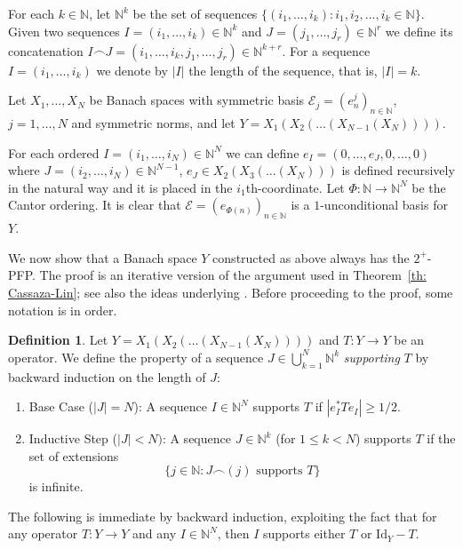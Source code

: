 \documentclass[11pt]{amsart}
\theoremstyle{plain}
\theoremstyle{definition}
\newtheorem{definition}[theorem]{Definition}
\numberwithin{equation}{section}
\newcommand{\N}{\mathbb{N}}
\newcommand{\Id}{\mathrm{Id}}
\renewcommand{\le}{\leqslant}
\renewcommand{\geq}{\geqslant}
\begin{document}
For each $k \in \N$, let $\N^k$ be the set of sequences $\{(i_1, \dots, i_k): i_1, i_2, \ldots, i_k \in \N\}$. Given two sequences $I = (i_1, \dots, i_k) \in \N^k$ and $J = (j_1, \dots, j_r) \in \N^r$ we define its concatenation $I \smallfrown J = (i_1, \dots, i_k, j_1, \dots, j_r) \in \N^{k+r}$. For a sequence $I = (i_1, \dots, i_k)$ we denote by $|I|$ the length of the sequence, that is, $|I| = k$.

Let $X_1, \dots, X_N$ be Banach spaces with symmetric basis $\mathcal{E}_j = (e^j_n)_{n \in \N}$, $j = 1, \dots, N$ and symmetric norms, and let $Y = X_1(X_{2}(\dots (X_{N-1}(X_N))))$.

For each ordered $I = (i_1, \dots, i_N) \in \N^N$ we can define $e_I = (0, \dots, e_{J}, 0, \dots, 0)$ where $J = (i_2, \dots, i_N) \in \N^{N-1}$, $e_J \in X_2(X_3(\dots(X_N)))$ is defined recursively in the natural way and it is placed in the $i_1$th-coordinate. Let $\Phi: \N \to \N^N$ be the Cantor ordering. It is clear that $\mathcal{E} = (e_{\Phi(n)})_{n \in \N}$ is a $1$-unconditional basis for $Y$.

We now show that a Banach space $Y$ constructed as above always has the $2^+$-PFP. The proof is an iterative version of the argument used in Theorem~\ref{th: Cassaza-Lin}; see also the ideas underlying \cite[Theorem~3]{CKL1976}. Before proceeding to the proof, some notation is in order.

\begin{definition}
    Let $Y =X_1(X_{2}(\dots (X_{N-1}(X_N))))$ and $T \colon Y \to Y$ be an operator. We define the property of a sequence $J \in \bigcup_{k=1}^N \mathbb{N}^k$ \emph{supporting} $T$ by backward induction on the length of $J$:
    \begin{enumerate}
        \item Base Case ($|J|=N$): A sequence $I \in \mathbb{N}^N$ supports $T$ if $|e_I^* T e_I| \geq 1/2$.
        \item Inductive Step ($|J|<N)$: A sequence $J \in \mathbb{N}^k$ (for $1 \le k < N$) supports $T$ if the set of extensions
        \begin{equation*}
            \{ j \in \mathbb{N} : J \smallfrown (j) \text{ supports } T \}
        \end{equation*}
        is infinite.
    \end{enumerate}
\end{definition}

The following is immediate by backward induction, exploiting the fact that for any operator $T \colon  Y \to Y$ and any $I \in \N^N$, then $I$ supports either $T$ or $\Id_Y-T$.
\end{document}
